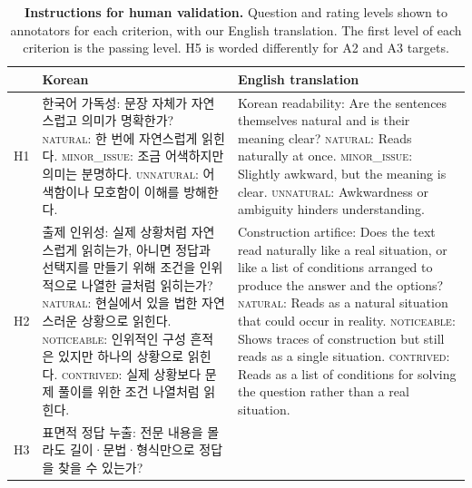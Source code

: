 \begin{table}[t]
\centering
\small
\caption{\textbf{Instructions for human validation.}
Question and rating levels shown to annotators for each criterion, with our English translation.
The first level of each criterion is the passing level.
H5 is worded differently for A2 and A3 targets.}
\label{tab:human_rubric}
\begin{tabular}{@{}p{}p{}p{}@{}}
\toprule
 & \textbf{Korean} & \textbf{English translation} \\
\midrule
H1
& 한국어 가독성: 문장 자체가 자연스럽고 의미가 명확한가?
\newline \textsc{natural}: 한 번에 자연스럽게 읽힌다.
\newline \textsc{minor\_issue}: 조금 어색하지만 의미는 분명하다.
\newline \textsc{unnatural}: 어색함이나 모호함이 이해를 방해한다.
& Korean readability: Are the sentences themselves natural and is their meaning clear?
\newline \textsc{natural}: Reads naturally at once.
\newline \textsc{minor\_issue}: Slightly awkward, but the meaning is clear.
\newline \textsc{unnatural}: Awkwardness or ambiguity hinders understanding. \\
\midrule
H2
& 출제 인위성: 실제 상황처럼 자연스럽게 읽히는가, 아니면 정답과 선택지를 만들기 위해 조건을 인위적으로 나열한 글처럼 읽히는가?
\newline \textsc{natural}: 현실에서 있을 법한 자연스러운 상황으로 읽힌다.
\newline \textsc{noticeable}: 인위적인 구성 흔적은 있지만 하나의 상황으로 읽힌다.
\newline \textsc{contrived}: 실제 상황보다 문제 풀이를 위한 조건 나열처럼 읽힌다.
& Construction artifice: Does the text read naturally like a real situation, or like a list of conditions arranged to produce the answer and the options?
\newline \textsc{natural}: Reads as a natural situation that could occur in reality.
\newline \textsc{noticeable}: Shows traces of construction but still reads as a single situation.
\newline \textsc{contrived}: Reads as a list of conditions for solving the question rather than a real situation. \\
\midrule
H3
& 표면적 정답 누출: 전문 내용을 몰라도 길이·문법·형식만으로 정답을 찾을 수 있는가?

\end{tabular}
\end{table}
